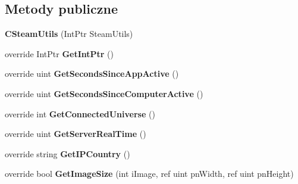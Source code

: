 \subsection*{Metody publiczne}
\begin{DoxyCompactItemize}
\item 
\mbox{\label{class_valve_1_1_steamworks_1_1_c_steam_utils_aecd1b401049d056ea4ece16a5141cd05}} 
{\bfseries C\+Steam\+Utils} (Int\+Ptr Steam\+Utils)
\item 
\mbox{\label{class_valve_1_1_steamworks_1_1_c_steam_utils_a40436b09ceb6ac65adcdc56c8d80c374}} 
override Int\+Ptr {\bfseries Get\+Int\+Ptr} ()
\item 
\mbox{\label{class_valve_1_1_steamworks_1_1_c_steam_utils_ab8907dfbe02bbacce06b7010d2ae622f}} 
override uint {\bfseries Get\+Seconds\+Since\+App\+Active} ()
\item 
\mbox{\label{class_valve_1_1_steamworks_1_1_c_steam_utils_a7986676d7ff0bf59647092b867b67a98}} 
override uint {\bfseries Get\+Seconds\+Since\+Computer\+Active} ()
\item 
\mbox{\label{class_valve_1_1_steamworks_1_1_c_steam_utils_a3e5ac0777d8bfaab0335cabf27b106c8}} 
override int {\bfseries Get\+Connected\+Universe} ()
\item 
\mbox{\label{class_valve_1_1_steamworks_1_1_c_steam_utils_adfb530df3f15b17fbcf9554c8b8c1a31}} 
override uint {\bfseries Get\+Server\+Real\+Time} ()
\item 
\mbox{\label{class_valve_1_1_steamworks_1_1_c_steam_utils_a93bd61a16367af1caa5e23cbe259e725}} 
override string {\bfseries Get\+I\+P\+Country} ()
\item 
\mbox{\label{class_valve_1_1_steamworks_1_1_c_steam_utils_a68ff1b628a73935b27b62f8c00ef3129}} 
override bool {\bfseries Get\+Image\+Size} (int i\+Image, ref uint pn\+Width, ref uint pn\+Height)

\end{DoxyCompactItemize}
